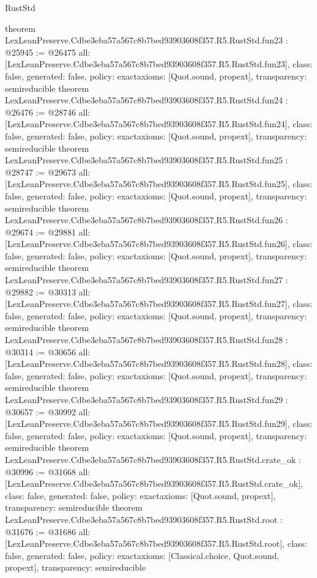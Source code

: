 \begin{lexlean}{RustStd}
\begin{coremodule}
{}
theorem LexLeanPreserve.Cdbe3eba57a567c8b7bed93903608f357.R5.RustStd.fun23 : @25945 := @26475 {
  all: [LexLeanPreserve.Cdbe3eba57a567c8b7bed93903608f357.R5.RustStd.fun23],
  class: false,
  generated: false,
  policy: exact{axioms: [Quot.sound, propext]},
  transparency: semireducible
}
theorem LexLeanPreserve.Cdbe3eba57a567c8b7bed93903608f357.R5.RustStd.fun24 : @26476 := @28746 {
  all: [LexLeanPreserve.Cdbe3eba57a567c8b7bed93903608f357.R5.RustStd.fun24],
  class: false,
  generated: false,
  policy: exact{axioms: [Quot.sound, propext]},
  transparency: semireducible
}
theorem LexLeanPreserve.Cdbe3eba57a567c8b7bed93903608f357.R5.RustStd.fun25 : @28747 := @29673 {
  all: [LexLeanPreserve.Cdbe3eba57a567c8b7bed93903608f357.R5.RustStd.fun25],
  class: false,
  generated: false,
  policy: exact{axioms: [Quot.sound, propext]},
  transparency: semireducible
}
theorem LexLeanPreserve.Cdbe3eba57a567c8b7bed93903608f357.R5.RustStd.fun26 : @29674 := @29881 {
  all: [LexLeanPreserve.Cdbe3eba57a567c8b7bed93903608f357.R5.RustStd.fun26],
  class: false,
  generated: false,
  policy: exact{axioms: [Quot.sound, propext]},
  transparency: semireducible
}
theorem LexLeanPreserve.Cdbe3eba57a567c8b7bed93903608f357.R5.RustStd.fun27 : @29882 := @30313 {
  all: [LexLeanPreserve.Cdbe3eba57a567c8b7bed93903608f357.R5.RustStd.fun27],
  class: false,
  generated: false,
  policy: exact{axioms: [Quot.sound, propext]},
  transparency: semireducible
}
theorem LexLeanPreserve.Cdbe3eba57a567c8b7bed93903608f357.R5.RustStd.fun28 : @30314 := @30656 {
  all: [LexLeanPreserve.Cdbe3eba57a567c8b7bed93903608f357.R5.RustStd.fun28],
  class: false,
  generated: false,
  policy: exact{axioms: [Quot.sound, propext]},
  transparency: semireducible
}
theorem LexLeanPreserve.Cdbe3eba57a567c8b7bed93903608f357.R5.RustStd.fun29 : @30657 := @30992 {
  all: [LexLeanPreserve.Cdbe3eba57a567c8b7bed93903608f357.R5.RustStd.fun29],
  class: false,
  generated: false,
  policy: exact{axioms: [Quot.sound, propext]},
  transparency: semireducible
}
theorem LexLeanPreserve.Cdbe3eba57a567c8b7bed93903608f357.R5.RustStd.crate_ok : @30996 := @31668 {
  all: [LexLeanPreserve.Cdbe3eba57a567c8b7bed93903608f357.R5.RustStd.crate_ok],
  class: false,
  generated: false,
  policy: exact{axioms: [Quot.sound, propext]},
  transparency: semireducible
}
theorem LexLeanPreserve.Cdbe3eba57a567c8b7bed93903608f357.R5.RustStd.root : @31676 := @31686 {
  all: [LexLeanPreserve.Cdbe3eba57a567c8b7bed93903608f357.R5.RustStd.root],
  class: false,
  generated: false,
  policy: exact{axioms: [Classical.choice, Quot.sound, propext]},
  transparency: semireducible
}


\end{coremodule}
\end{lexlean}
